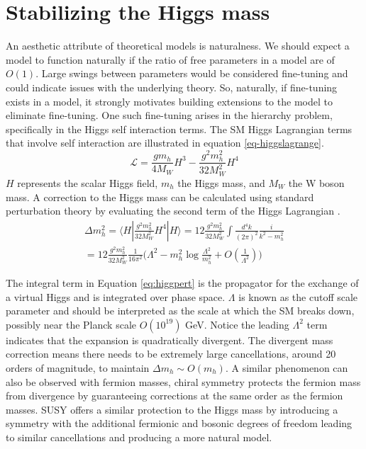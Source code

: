 \section{Stabilizing the Higgs mass}

An aesthetic attribute of theoretical models is naturalness. We should expect a model to function naturally if the ratio of free parameters in a model are of $O(1)$. Large swings between parameters would be considered fine-tuning and could indicate issues with the underlying theory. So, naturally, if fine-tuning exists in a model, it strongly motivates building extensions to the model to eliminate fine-tuning. %
One such fine-tuning arises in the hierarchy problem, specifically in the Higgs self interaction terms. The SM Higgs Lagrangian terms that involve self interaction are illustrated in equation \ref{eq-higgslagrange}.
\begin{equation}
\label{eq-higgslagrange}
\mathcal{L}=\frac{gm_h}{4M_W}H^3 - \frac{g^2m_h^2}{32M_W^2}H^4
\end{equation}
$H$ represents the scalar Higgs field, $m_h$ the Higgs mass, and $M_W$ the W boson  mass. A correction to the Higgs mass can be calculated using standard perturbation theory by evaluating the second term of the Higgs Lagrangian \cite{Baer:2007izw}. 
\begin{equation}
\label{eq:higgpert}
\begin{split}
\Delta m_h^2 = \langle H | \frac{g^2m_h^2}{32M_W^2} H^4 | H  \rangle = 12\frac{g^2m_h^2}{32M_W^2}\int \frac{d^4 k}{(2\pi)^2} \frac{i}{k^2 - m_h^2}\\
= 12\frac{g^2m_h^2}{32M_W^2} \frac{1}{16\pi^2}\big( \Lambda^2 - m_h^2\log\frac{\Lambda^2}{m_h^2} + O(\frac{1}{\Lambda^2})\big)
\end{split} 
\end{equation}
 
The integral term in Equation \ref{eq:higgpert}  is the propagator for the exchange of a virtual Higgs and is integrated over phase space. $\Lambda$ is known as the cutoff scale parameter and should be interpreted as the scale at which the SM breaks down, possibly near the Planck scale $O(10^{19})$ GeV. Notice the leading $\Lambda^2$ term indicates that the expansion is quadratically divergent. The divergent mass correction means there needs to be extremely large cancellations, around 20 orders of magnitude, to maintain $\Delta m_h \sim O(m_h)$. A similar  phenomenon can also be observed with fermion masses, chiral symmetry protects the fermion mass from divergence by guaranteeing corrections at the same order as the fermion masses. SUSY offers a similar protection to the Higgs mass by introducing a symmetry with the additional fermionic and bosonic degrees of freedom leading to similar cancellations and producing a more natural model. 


